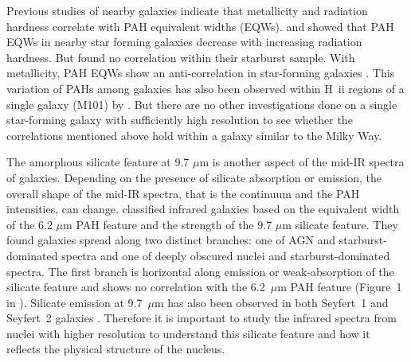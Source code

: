 Previous studies of nearby galaxies indicate that metallicity and radiation hardness correlate with PAH equivalent widths (EQWs). 
\citet{Smith:2007lr} and \citet{Engelbracht_2008} showed that PAH EQWs in nearby star forming galaxies  decrease with increasing radiation hardness. 
But  \citet{Brandl2006} found no correlation within their starburst sample.  With metallicity, PAH EQWs show an anti-correlation 
in star-forming galaxies \citep{Marble_2010}. This variation of PAHs among galaxies has also been observed within H~{\sc ii} regions 
of a single galaxy (M101) by \citet{Gordon:2008lr}. But there are no other investigations done on a single star-forming galaxy with 
sufficiently high resolution to see whether the correlations mentioned above hold within a galaxy similar to the Milky Way.

The amorphous silicate feature at 9.7 $\mu$m is another aspect of the mid-IR spectra of galaxies. Depending on the presence of silicate 
absorption or emission, the overall shape of the mid-IR spectra, that is the continuum and the PAH intensities, can change. \citet{Spoon2007} 
classified infrared galaxies based on the equivalent width of the 6.2 $\mu$m PAH feature and the strength of the 9.7 $\mu$m silicate feature. 
They  found galaxies spread along two distinct branches: one of AGN and starburst-dominated spectra and one of deeply obscured 
nuclei and starburst-dominated spectra. The first branch is horizontal along emission or weak-absorption of the silicate feature and shows no 
correlation with the 6.2~$\mu$m PAH feature (Figure~1 in \citet{Spoon2007}). 
Silicate emission at 9.7~$\mu$m has also been observed in both 
Seyfert~1 and Seyfert~2 galaxies \citep{Mason2009}. Therefore it is important to study the infrared spectra from nuclei with higher resolution 
to understand this silicate feature and how it reflects the physical structure of the nucleus. %


